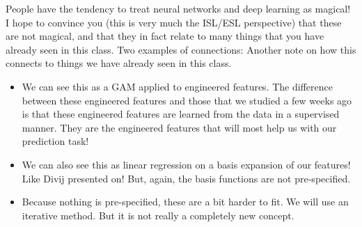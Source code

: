 People have the tendency to treat neural networks and deep learning as magical! I hope to convince you (this is very much the ISL/ESL perspective) that these are not magical, and that they in fact relate to many things that you have already seen in this class. Two examples of connections:
Another note on how this connects to things we have already seen in this class. 
\begin{itemize}
\item We can see this as a GAM applied to engineered features. The difference between these engineered features and those that we studied a few weeks ago is that these engineered features are learned from the data in a supervised manner. They are the engineered features that will most help us with our prediction task!
\item We can also see this as linear regression on a basis expansion of our features! Like Divij presented on! But, again, the basis functions are not pre-specified. 	
\item Because nothing is pre-specified, these are a bit harder to fit. We will use an iterative method. But it is not really a completely new concept. 
\end{itemize}


